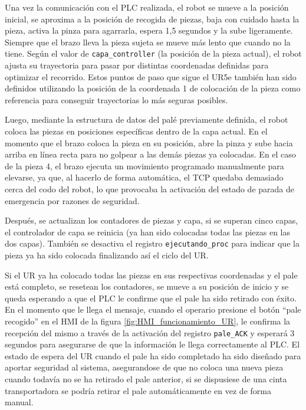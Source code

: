Una vez la comunicación con el PLC realizada, el robot se mueve a la posición inicial, se aproxima a la posición de recogida de piezas, baja con cuidado hasta la pieza, activa la pinza para agarrarla, espera 1,5 segundos y la sube ligeramente. Siempre que el brazo lleva la pieza sujeta se mueve más lento que cuando no la tiene. Según el valor de \texttt{capa\_controller} (la posición de la pieza actual), el robot ajusta su trayectoria para pasar por distintas coordenadas definidas para optimizar el recorrido. Estos puntos de paso que sigue el UR5e también han sido definidos utilizando la posición de la coordenada 1 de colocación de la pieza como referencia para conseguir trayectorias lo más seguras posibles.

Luego, mediante la estructura de datos del palé previamente definida, el robot coloca las piezas en posiciones específicas dentro de la capa actual. En el momento que el brazo coloca la pieza en su posición, abre la pinza y sube hacia arriba en línea recta para no golpear a las demás piezas ya colocadas. En el caso de la pieza 4, el brazo ejecuta un movimiento programado manualmente para elevarse, ya que, al hacerlo de forma automática, el TCP quedaba demasiado cerca del codo del robot, lo que provocaba la activación del estado de parada de emergencia por razones de seguridad.

Después, se actualizan los contadores de piezas y capa, si se superan cinco capas, el controlador de capa se reinicia (ya han sido colocadas todas las piezas en las dos capas). También se desactiva el registro \texttt{ejecutando\_proc} para indicar que la pieza ya ha sido colocada finalizando así el ciclo del UR.

Si el UR ya ha colocado todas las piezas en sus respectivas coordenadas y el pale está completo, se resetean los contadores, se mueve a su posición de inicio y se queda esperando a que el PLC le confirme que el pale ha sido retirado con éxito. En el momento que le llega el mensaje, cuando el operario presione el botón ``pale recogido'' en el HMI de la figura \ref{fig:HMI_funcionamiento_UR}, le confirma la recepción del mismo a través de la activación del registro \texttt{pale\_ACK} y esperará 3 segundos para asegurarse de que la información le llega correctamente al PLC. El estado de espera del UR cuando el pale ha sido completado ha sido diseñado para aportar seguridad al sistema, asegurandose de que no coloca una nueva pieza cuando todavía no se ha retirado el pale anterior, si se dispusiese de una cinta transportadora se podría retirar el pale automáticamente en vez de forma manual.

